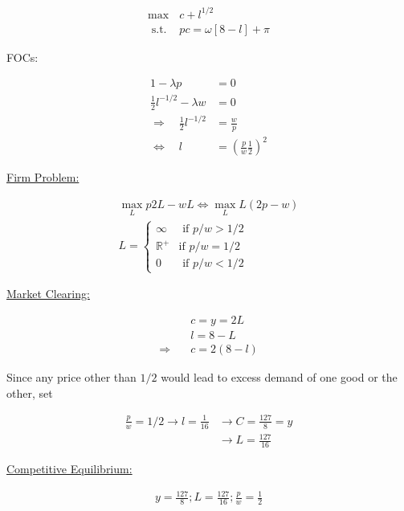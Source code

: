 {\begin{enumerate}[label=(\alph*)]
{\begin{align*}
    \max & c+l^{1 / 2} \\
    \text { s.t. } & p c=\omega[8-l]+\pi
\end{align*}

FOCs:

\begin{align*}
    1-\lambda p &= 0 \\
    \frac{1}{2} l^{-1 / 2}-\lambda w &= 0 \\
    \Longrightarrow\quad \frac{1}{2} l^{-1 / 2}&=\frac{w}{p} \\
    \Leftrightarrow\quad l&=\left(\frac{p}{w} \frac{1}{2}\right)^2
\end{align*}

\underline{Firm Problem:}

\begin{align*}
    \max _L p 2L-w L \Leftrightarrow \max _L L(2 p-w) \\
    L=\left\{\begin{array}{lll}
        \infty & \text { if } p/ w>1 / 2 \\
        \mathbb{R}^{+} & \text {if } p/ w=1 / 2 \\
        0 & \text { if } p/ w<1 / 2
    \end{array}\right.
\end{align*}

\underline{Market Clearing:}

\begin{align*}
    & c=y=2 L \\
    & l=8-L \\
    \Longrightarrow\quad & c=2(8-l)
\end{align*}

Since any price other than $1 / 2$ would lead to excess demand of one good or the other, set

\begin{align*}
    \frac{p}{w}=1 / 2 \longrightarrow l=\frac{1}{16} & \longrightarrow C=\frac{127}{8}=y \\
    & \longrightarrow L=\frac{127}{16}
\end{align*}

\underline{Competitive Equilibrium:}

\begin{align*}
    y=\frac{127}{8} ; L=\frac{127}{16} ; \frac{p}{w}=\frac{1}{2}
\end{align*}

}
\end{enumerate}}
